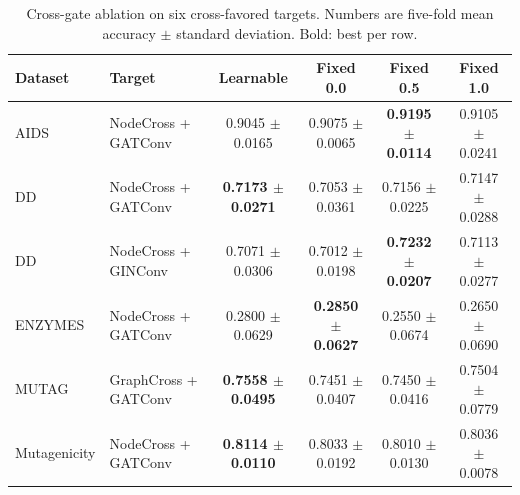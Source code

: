 \begin{table}[t]
\centering
\scriptsize
\setlength{\tabcolsep}{4pt}
\caption{Cross-gate ablation on six cross-favored targets. Numbers are five-fold mean accuracy $\pm$ standard deviation. Bold: best per row.}
\label{tab:cross_gate_ablation_full}
\begin{tabular}{llcccc}
\toprule
Dataset & Target & Learnable & Fixed 0.0 & Fixed 0.5 & Fixed 1.0 \\
\midrule
AIDS & NodeCross + GATConv & 0.9045 $\pm$ 0.0165 & 0.9075 $\pm$ 0.0065 & \textbf{0.9195 $\pm$ 0.0114} & 0.9105 $\pm$ 0.0241 \\
DD & NodeCross + GATConv & \textbf{0.7173 $\pm$ 0.0271} & 0.7053 $\pm$ 0.0361 & 0.7156 $\pm$ 0.0225 & 0.7147 $\pm$ 0.0288 \\
DD & NodeCross + GINConv & 0.7071 $\pm$ 0.0306 & 0.7012 $\pm$ 0.0198 & \textbf{0.7232 $\pm$ 0.0207} & 0.7113 $\pm$ 0.0277 \\
ENZYMES & NodeCross + GATConv & 0.2800 $\pm$ 0.0629 & \textbf{0.2850 $\pm$ 0.0627} & 0.2550 $\pm$ 0.0674 & 0.2650 $\pm$ 0.0690 \\
MUTAG & GraphCross + GATConv & \textbf{0.7558 $\pm$ 0.0495} & 0.7451 $\pm$ 0.0407 & 0.7450 $\pm$ 0.0416 & 0.7504 $\pm$ 0.0779 \\
Mutagenicity & NodeCross + GATConv & \textbf{0.8114 $\pm$ 0.0110} & 0.8033 $\pm$ 0.0192 & 0.8010 $\pm$ 0.0130 & 0.8036 $\pm$ 0.0078 \\
\bottomrule
\end{tabular}
\end{table}
